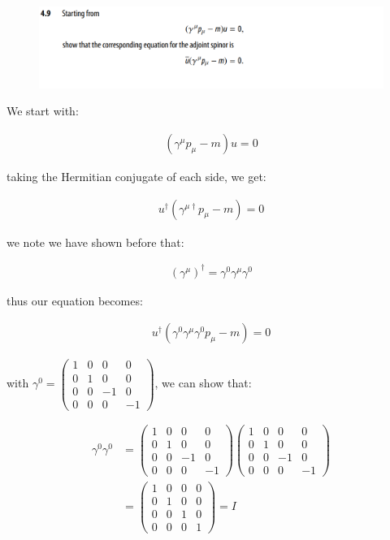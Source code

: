 \documentclass[11pt]{article}
\theoremstyle{definition}
\begin{document}
\newpage

\begin{figure}[h!]
    \centering
    \includegraphics[scale = 0.55]{4.9a.png}
\end{figure}

We start with:

\begin{align}
    (\gamma^{\mu} p_{\mu} - m)u = 0
\end{align}

taking the Hermitian conjugate of each side, we get:

\begin{align}
    u^{\dagger}(\gamma^{\mu\dagger} p_{\mu} - m) = 0
\end{align}

we note we have shown before that:

\begin{align}
    (\gamma^{\mu})^{\dagger} = \gamma^{0} \gamma^{\mu} \gamma^{0}
\end{align}

thus our equation becomes:

\begin{align}
    u^{\dagger}(\gamma^{0} \gamma^{\mu} \gamma^{0} p_{\mu} - m) = 0
\end{align}

with $\gamma^{0} = 
\begin{pmatrix}
    1&0&0&0\\ 
    0&1&0&0\\ 
    0&0&-1&0\\ 
    0&0&0&-1
\end{pmatrix}$, we can show that:

\begin{align}
    \gamma^{0}\gamma^{0} &=
    \begin{pmatrix}
        1&0&0&0\\ 
        0&1&0&0\\ 
        0&0&-1&0\\ 
        0&0&0&-1
    \end{pmatrix}
    \begin{pmatrix}
        1&0&0&0\\ 
        0&1&0&0\\ 
        0&0&-1&0\\ 
        0&0&0&-1
    \end{pmatrix}\\
    &=
    \begin{pmatrix}
        1&0&0&0\\ 
        0&1&0&0\\ 
        0&0&1&0\\ 
        0&0&0&1
    \end{pmatrix}
    =I
\end{align}
\end{document}
